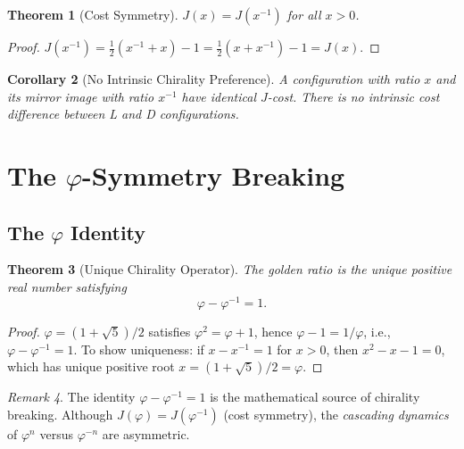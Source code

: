 \documentclass[12pt,a4paper]{article}
\newtheorem{theorem}{Theorem}[section]
\newtheorem{corollary}[theorem]{Corollary}
\theoremstyle{definition}
\theoremstyle{remark}
\newtheorem{remark}[theorem]{Remark}
\begin{document}
\begin{theorem}[Cost Symmetry]
\label{thm:symmetry}
$J(x) = J(x^{-1})$ for all $x > 0$.
\end{theorem}

\begin{proof}
$J(x^{-1}) = \tfrac{1}{2}(x^{-1} + x) - 1
= \tfrac{1}{2}(x + x^{-1}) - 1 = J(x)$.
\end{proof}

\begin{corollary}[No Intrinsic Chirality Preference]
A configuration with ratio $x$ and its mirror image with ratio
$x^{-1}$ have identical $J$-cost.  There is no intrinsic cost
difference between L and D configurations.
\end{corollary}

\section{The $\varphi$-Symmetry Breaking}
\label{sec:breaking}

\subsection{The $\varphi$ Identity}

\begin{theorem}[Unique Chirality Operator]
\label{thm:chirality-op}
The golden ratio is the unique positive real number satisfying
\begin{equation}
  \varphi - \varphi^{-1} = 1.
\end{equation}
\end{theorem}

\begin{proof}
$\varphi = (1 + \sqrt{5})/2$ satisfies $\varphi^2 = \varphi + 1$,
hence $\varphi - 1 = 1/\varphi$, i.e.,
$\varphi - \varphi^{-1} = 1$.  To show uniqueness: if
$x - x^{-1} = 1$ for $x > 0$, then $x^2 - x - 1 = 0$, which has
unique positive root $x = (1 + \sqrt{5})/2 = \varphi$.
\end{proof}

\begin{remark}
The identity $\varphi - \varphi^{-1} = 1$ is the mathematical source
of chirality breaking.  Although $J(\varphi) = J(\varphi^{-1})$
(cost symmetry), the \emph{cascading dynamics} of $\varphi^n$ versus
$\varphi^{-n}$ are asymmetric.
\end{remark}
\end{document}
